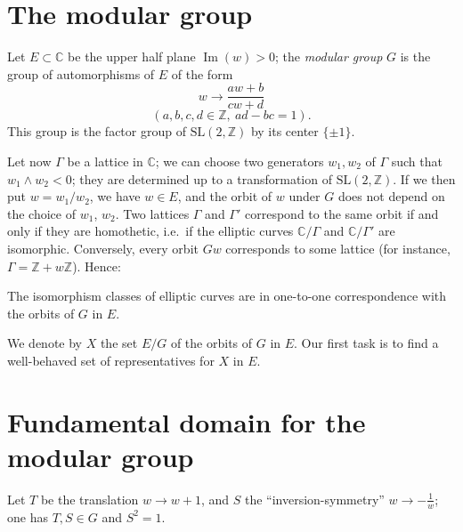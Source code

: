 
\setcounter{proposition}{0}
\setcounter{lemma}{0}
\setcounter{corollary}{0}

\section{The modular group}

Let $E\subset\mathbb{C}$ be the upper half plane $\operatorname{Im}(w)>0$;
the \emph{modular group} $G$ is the group of automorphisms of $E$ of the form
\[
w\longrightarrow\frac{aw+b}{cw+d}
\]
\[
(a,b,c,d\in\mathbb{Z},\ ad-bc=1).
\]
This group is the factor group of $\mathrm{SL}(2,\mathbb{Z})$ by its center
$\{\pm 1\}$.

Let now $\Gamma$ be a lattice in $\mathbb{C}$; we can choose two generators
$w_{1},w_{2}$ of $\Gamma$ such that $w_{1}\wedge w_{2}<0$; they are
determined up to a transformation of $\mathrm{SL}(2,\mathbb{Z})$. If we then
put $w=w_{1}/w_{2}$, we have $w\in E$, and the orbit of $w$ under $G$ does
not depend on the choice of $w_{1}$, $w_{2}$. Two lattices $\Gamma$ and
$\Gamma'$ correspond to the same orbit if and only if they are homothetic,
i.e.\ if the elliptic curves $\mathbb{C}/\Gamma$ and $\mathbb{C}/\Gamma'$
are isomorphic. Conversely, every orbit $Gw$ corresponds to some lattice
(for instance, $\Gamma=\mathbb{Z}+w\mathbb{Z}$). Hence:

\begin{proposition}\label{prop:II-1}
The isomorphism classes of elliptic curves are in one-to-one
correspondence with the orbits of $G$ in $E$.
\end{proposition}

We denote by $X$ the set $E/G$ of the orbits of $G$ in $E$. Our first task
is to find a well-behaved set of representatives for $X$ in $E$.

\section{Fundamental domain for the modular group}

Let $T$ be the translation $w\longrightarrow w+1$, and $S$ the
``inversion-symmetry'' $w\longrightarrow -\frac{1}{w}$; one has $T,S\in G$
and $S^{2}=1$.

